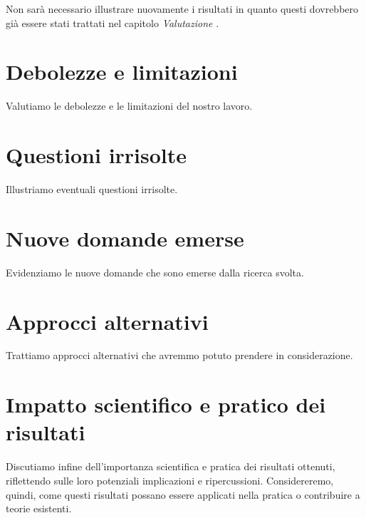 \medskip

Non sarà necessario illustrare nuovamente i risultati in quanto questi dovrebbero già essere stati trattati nel capitolo \textit{Valutazione} \cite{pfandzelter2022thesis}.

\section{Debolezze e limitazioni}

Valutiamo le debolezze e le limitazioni del nostro lavoro.

\section{Questioni irrisolte}

Illustriamo eventuali questioni irrisolte.

\section{Nuove domande emerse}

Evidenziamo le nuove domande che sono emerse dalla ricerca svolta.

\section{Approcci alternativi}

Trattiamo approcci alternativi che avremmo potuto prendere in considerazione.

\section{Impatto scientifico e pratico dei risultati}

Discutiamo infine dell'importanza scientifica e pratica dei risultati ottenuti, riflettendo sulle loro potenziali implicazioni e ripercussioni. Considereremo, quindi, come questi risultati possano essere applicati nella pratica o contribuire a teorie esistenti.


